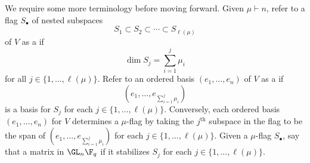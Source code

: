 We require some more terminology before moving forward.
Given \(\mu \vdash n\), refer to a flag $S_\bullet$ of nested subspaces
$$ S_1 \subset S_2 \subset \cdots \subset S_{\ell(\mu)}$$
of $V$
as a  if
$$\dim S_j = \sum_{i=1}^j \mu_i$$ for all $j \in \{1,\ldots,\ell(\mu)\}$.
Refer to an ordered basis $(e_1,\ldots,e_{n})$ of $V$ as a  if
$$ \left (e_1,\ldots,e_{\sum_{i=1}^j \mu_i} \right ) $$
is a basis for $S_j$ for each $j \in \{1,\ldots,\ell(\mu)\}$.
Conversely, each ordered basis \((e_1,\ldots,e_n)\) for \(V\) determines a \(\mu\)-flag by taking the \(j^\text{th}\) subspace in the flag to be the span of \(\left ( e_1,\ldots,e_{\sum_{i=1}^j \mu_i} \right )\) for each \(j \in \{1,\ldots,\ell(\mu)\}\).
Given a $\mu$-flag $S_\bullet$, say that a matrix in $\GL_{n} \F_q$  if it stabilizes $S_j$ for each $j \in \{1,\ldots,\ell(\mu)\}$.

